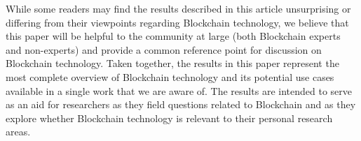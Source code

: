 While some readers may find the results described in this article unsurprising or differing from their viewpoints regarding Blockchain technology, we believe that this paper will be helpful to the community at large (both Blockchain experts and non-experts) and provide a common reference point for discussion on Blockchain technology.
Taken together, the results in this paper represent the most complete overview of Blockchain technology and its potential use cases available in a single work that we are aware of.
The results are intended to serve as an aid for researchers as they field questions related to Blockchain and as they explore whether Blockchain technology is relevant to their personal research areas.

	
	
